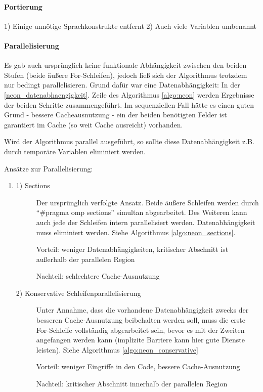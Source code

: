 \paragraph{Portierung}
\label{neon_portierung}
1) Einige unnötige Sprachkonstrukte entfernt
2) Auch viele Variablen umbenannt

\paragraph{Parallelisierung}
Es gab auch ursprünglich keine funktionale Abhängigkeit zwischen den beiden Stufen (beide äußere For-Schleifen),  jedoch ließ sich der Algorithmus trotzdem nur bedingt parallelisieren. Grund dafür war eine Datenabhängigkeit: In der \ref{neon_datenabhaengigkeit}. Zeile des Algorithmus \ref{algo:neon} werden Ergebnisse der beiden Schritte zusammengeführt. Im sequenziellen Fall hätte es einen guten Grund - bessere Cacheausnutzung - ein der beiden benötigten Felder ist garantiert im Cache (so weit Cache ausreicht) vorhanden.

Wird der Algorithmus parallel ausgeführt, so sollte diese Datenabhängigkeit z.B. durch temporäre Variablen eliminiert werden. 

Ansätze zur Parallelisierung:
\begin{enumerate}
	\item [] \begin{description} %
		\item[1) Sections] Der ursprünglich verfolgte Ansatz. Beide äußere Schleifen werden durch ``\#pragma omp sections'' simultan abgearbeitet. Des Weiteren kann auch jede der Schleifen intern parallelisiert werden. Datenabhängigkeit muss eliminiert werden. Siehe Algorithmus \ref{algo:neon_sections}.
		
		Vorteil: weniger Datenabhängigkeiten, kritischer Abschnitt ist außerhalb der parallelen Region
		
		Nachteil: schlechtere Cache-Ausnutzung
		\item[2) Konservative Schleifenparallelisierung] Unter Annahme, dass die vorhandene Datenabhängigkeit zwecks der besseren Cache-Ausnutzung beibehalten werden soll, muss die erste For-Schleife vollständig abgearbeitet sein, bevor es mit der Zweiten angefangen werden kann (implizite Barriere kann hier gute Dienste leisten). Siehe Algorithmus \ref{algo:neon_conservative}
		
		Vorteil: weniger Eingriffe in den Code, bessere Cache-Ausnutzung
		
		Nachteil: kritischer Abschnitt innerhalb der parallelen Region 
	\end{description}
\end{enumerate}

